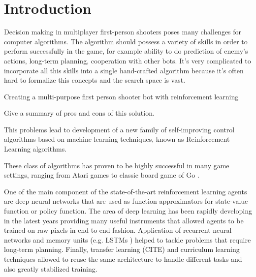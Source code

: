 \section{Introduction}



Decision making in multiplayer first-person shooters poses many challenges for computer algorithms.
The algorithm should possess a variety of skills in order to perform successfully in the game,
for example ability to do prediction of enemy's actions, long-term planning, cooperation with other
bots.
It's very complicated to incorporate all this skills into a single hand-crafted algorithm because
it's often hard to formalize this concepts and the search space is vast.

Creating a multi-purpose first person shooter bot with reinforcement learning

Give a summary of pros and cons of this solution.


This problems lead to development of a new family of self-improving control algorithms based on machine learning techniques,
known as Reinforcement Learning algorithms.



These class of algorithms has proven to be highly successful in many game settings,
ranging from Atari games \cite{Atari} to classic board game of Go \cite{AlphaGo}.

One of the main component of the state-of-the-art reinforcement learning agents are deep neural networks that are used as function approximators for state-value function or policy function.
The area of deep learning has been rapidly developing in the latest years providing many useful
instruments that allowed agents to be trained on raw pixels in end-to-end fashion.
Application of recurrent neural networks\cite{RLRNN} and memory units (e.g. LSTMs \cite{TextGamesLSTM}) helped to tackle problems that require long-term planning.
Finally, transfer learning (CITE) and curriculum learning \cite{Curriculum} techniques allowed to reuse the same architecture to handle different tasks and also greatly stabilized training.

